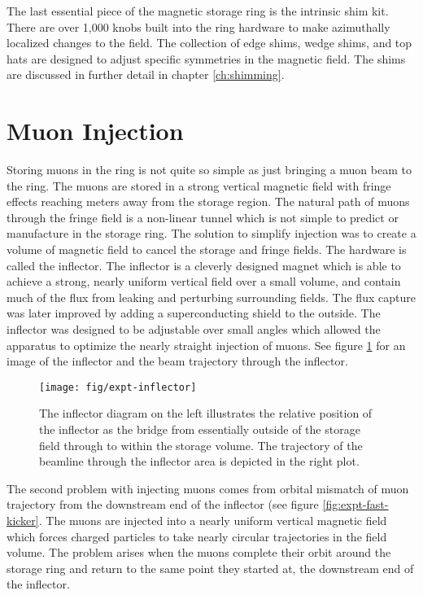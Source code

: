 The last essential piece of the magnetic storage ring is the intrinsic shim kit.  There are over 1,000 knobs built into the ring hardware to make azimuthally localized changes to the field. The collection of edge shims, wedge shims, and top hats are designed to adjust specific symmetries in the magnetic field.  The shims are discussed in further detail in chapter \ref{ch:shimming}.

\section{Muon Injection} \label{sec:muon-injection}

Storing muons in the ring is not quite so simple as just bringing a muon beam to the ring.  The muons are stored in a strong vertical magnetic field with fringe effects reaching meters away from the storage region.  The natural path of muons through the fringe field is a non-linear tunnel which is not simple to predict or manufacture in the storage ring.  The solution to simplify injection was to create a volume of magnetic field to cancel the storage and fringe fields. The hardware is called the inflector.  The inflector is a cleverly designed magnet which is able to achieve a strong, nearly uniform vertical field over a small volume, and contain much of the flux from leaking and perturbing surrounding fields.  The flux capture was later improved by adding a superconducting shield to the outside.  The inflector was designed to be adjustable over small angles which allowed the apparatus to optimize the nearly straight injection of muons. See figure \ref{fig:expt-inflector} for an image of the inflector and the beam trajectory through the inflector. \cite{e989-tdr, e821-prd}

\begin{figure}
\label{fig:expt-inflector}
\texttt{[image: fig/expt-inflector]}
\caption{The inflector diagram on the left illustrates the relative position of the inflector as the bridge from essentially outside of the storage field through to within the storage volume.  The trajectory of the beamline through the inflector area is depicted in the right plot.}
\end{figure}

The second problem with injecting muons comes from orbital mismatch of muon trajectory from the downstream end of the inflector (see figure \ref{fig:expt-fast-kicker}.  The muons are injected into a nearly uniform vertical magnetic field which forces charged particles to take nearly circular trajectories in the field volume.  The problem arises when the muons complete their orbit around the storage ring and return to the same point they started at, the downstream end of the inflector.


